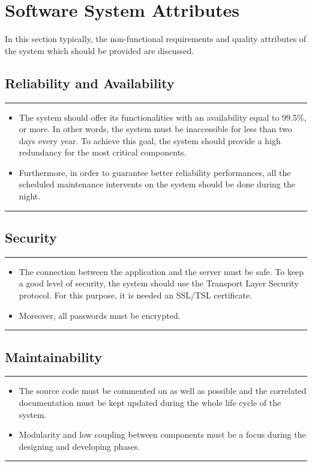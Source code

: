 \documentclass{Configuration_Files/Template}
\begin{document}
\section{Software System Attributes}

In this section typically, the non-functional requirements and quality attributes of the system which should be provided are discussed. 

\subsection{Reliability and Availability}

{\color{bluepoli}\rule{\linewidth}{0.1pt}}
\begin{itemize}
\item The system should offer its functionalities with an availability equal to 99.5\%, or more. In other words, the system must be inaccessible for less than two days every year. To achieve this goal, the system should provide a high redundancy for the most critical components.
\item Furthermore, in order to guarantee better reliability performances, all the scheduled maintenance intervents on the system should be done during the night. \\
\end{itemize} 
{\color{bluepoli}\rule{\linewidth}{0.1pt}}

\subsection{Security}

{\color{bluepoli}\rule{\linewidth}{0.1pt}}
\begin{itemize}
\item The connection between the application and the server must be safe. To keep a good level of security, the system should use the Transport Layer Security protocol. For this purpose, it is needed an SSL/TSL certificate.
\item Moreover, all passwords must be encrypted.\\
\end{itemize}
{\color{bluepoli}\rule{\linewidth}{0.1pt}}

\subsection{Maintainability}

{\color{bluepoli}\rule{\linewidth}{0.1pt}}
\begin{itemize}
\item The source code must be commented on as well as possible and the correlated documentation must be kept updated during the whole life cycle of the system. 
\item Modularity and low coupling between components must be a focus during the designing and developing phases.\\
\end{itemize}
{\color{bluepoli}\rule{\linewidth}{0.1pt}}
\end{document}
